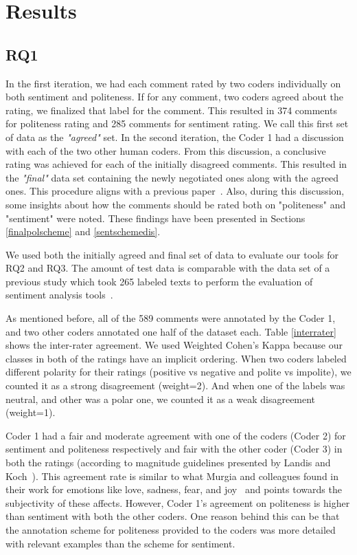  
\section{Results}

\subsection{RQ1 }\label{gt}

In the first iteration, we had each comment rated by two coders individually on both sentiment and politeness. If for any comment, two coders agreed about the rating, we finalized that label for the comment. This resulted in 374 comments for politeness rating and 285 comments for sentiment rating. We call this first set of data as the \textit{"agreed"} set.
In the second iteration, the Coder 1 had a discussion with each of the two other human coders. From this discussion, a conclusive rating was achieved for each of the initially disagreed comments. This resulted in the \textit{"final" }data set containing the newly negotiated ones along with the agreed ones. This procedure aligns with a previous paper~\cite{ahmed2017senticr}. Also, during this discussion, some insights about how the comments should be rated both on "politeness" and "sentiment" were noted. These findings have been presented in Sections \ref{finalpolscheme} and \ref{sentschemedis}.

We used both the initially agreed and final set of data to evaluate our tools for RQ2 and RQ3. The amount of test data is comparable with the data set of a previous study which took 265 labeled texts to perform the evaluation of sentiment analysis tools~\cite{jongeling2017negative}.

As mentioned before, all of the 589 comments were annotated by the Coder 1, and two other coders annotated one half of the dataset each. Table \ref{interrater} shows the inter-rater agreement. We used Weighted Cohen's Kappa because our classes in both of the ratings have an implicit ordering. When two coders labeled different polarity for their ratings (positive vs negative and polite vs impolite), we counted it as a strong disagreement (weight=2). And when one of the labels was neutral, and other was a polar one, we counted it as a weak disagreement (weight=1).

Coder 1 had a fair and moderate agreement with one of the coders (Coder 2) for sentiment and politeness respectively and fair with the other coder (Coder 3) in both the ratings (according to magnitude guidelines presented by Landis and Koch~\cite{landis1977measurement}). This agreement rate is similar to what Murgia and colleagues found in their work for emotions like love, sadness, fear, and joy~\cite{murgia2014developers} and points towards the subjectivity of these affects.
However, 
Coder 1's agreement on politeness 
is higher than sentiment 
with both the other coders. 
One reason behind this can be 
that the annotation scheme for politeness 
provided to the coders 
was more detailed with relevant examples 
than the scheme for sentiment. 


